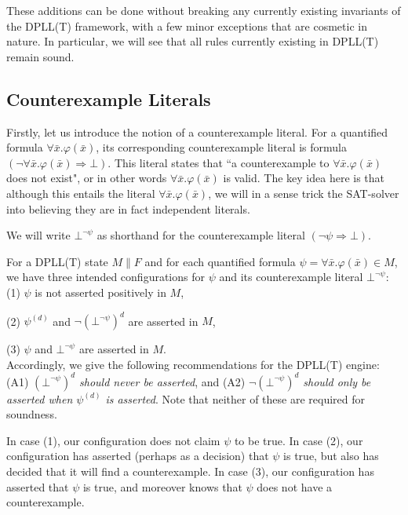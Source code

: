 \documentclass{llncs}
\begin{document}
These additions can be done without breaking any currently existing invariants of the DPLL(T) framework, with a few minor exceptions that are cosmetic in nature.
In particular, we will see that all rules currently existing in DPLL(T) remain sound.

\subsection{Counterexample Literals}

Firstly, let us introduce the notion of a counterexample literal.
For a quantified formula $\forall \bar{ x }. \varphi( \bar{ x } )$, its corresponding counterexample literal is formula $(\neg \forall \bar{ x }. \varphi( \bar{ x } ) \Rightarrow \bot)$.
This literal states that ``a counterexample to $\forall \bar{ x }. \varphi( \bar{ x } )$ does not exist", or in other words $\forall \bar{ x }. \varphi( \bar{ x } )$ is valid.
The key idea here is that although this entails the literal $\forall \bar{ x }. \varphi( \bar{ x } )$, we will in a sense trick the SAT-solver into believing they are in fact independent literals.

We will write $\bot^{\neg \psi}$ as shorthand for the counterexample literal $(\neg \psi \Rightarrow \bot)$.

For a DPLL(T) state $M \parallel F$ and for each quantified formula $\psi = \forall \bar{ x }. \varphi( \bar{ x } ) \in M$, we have three intended configurations for $\psi$ and its counterexample literal $\bot^{\neg \psi}$: \\

(1) $\psi$ is not asserted positively in $M$, 

(2) $\psi^{(d)}$ and $\neg (\bot^{\neg \psi})^d$ are asserted in $M$, 

(3) $\psi$ and $\bot^{\neg \psi}$ are asserted in $M$. \\

Accordingly, we give the following recommendations for the DPLL(T) engine: (A1) \emph{$(\bot^{\neg \psi})^d$ should never be asserted}, and (A2) \emph{ $\neg (\bot^{\neg \psi})^d$ should only be asserted when $\psi^{(d)}$ is asserted}.
Note that neither of these are required for soundness.

In case (1), our configuration does not claim $\psi$ to be true.
In case (2), our configuration has asserted (perhaps as a decision) that $\psi$ is true, but also has decided that it will find a counterexample.
In case (3), our configuration has asserted that $\psi$ is true, and moreover knows that $\psi$ does not have a counterexample.
\end{document}
